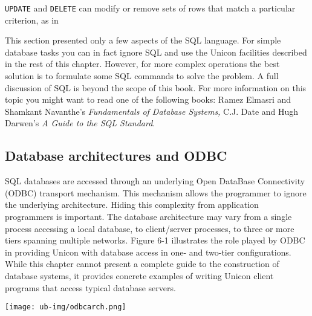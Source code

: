 
\texttt{UPDATE} and \texttt{DELETE} can modify or remove sets of rows
that match a particular criterion, as in


This section presented only a few aspects of the SQL language. For
simple database tasks you can in fact ignore SQL and use the Unicon
facilities described in the rest of this chapter. However, for more
complex operations the best solution is to formulate some SQL commands
to solve the problem. A full discussion of SQL is beyond the scope of
this book. For more information on this topic you might want to read
one of the following books: Ramez Elmasri and Shamkant
Navanthe's \textit{Fundamentals of Database Systems,}
C.J. Date and Hugh Darwen's \textit{A Guide to the SQL Standard}.

\subsection*{Database architectures and ODBC}

SQL databases are accessed through an underlying Open
DataBase Connectivity (ODBC) transport mechanism. This mechanism allows
the programmer to ignore the underlying architecture. Hiding this
complexity from application programmers is important. The database
architecture may vary from a single process accessing a local database,
to client/server processes, to three or more tiers spanning multiple
networks. Figure 6-1 illustrates the role played by ODBC in providing
Unicon with database access in one- and two-tier configurations. While
this chapter cannot present a complete guide to the construction of
database systems, it provides concrete examples of writing Unicon
client programs that access typical database servers.

\begin{center}
\texttt{[image: ub-img/odbcarch.png]}
\end{center}

